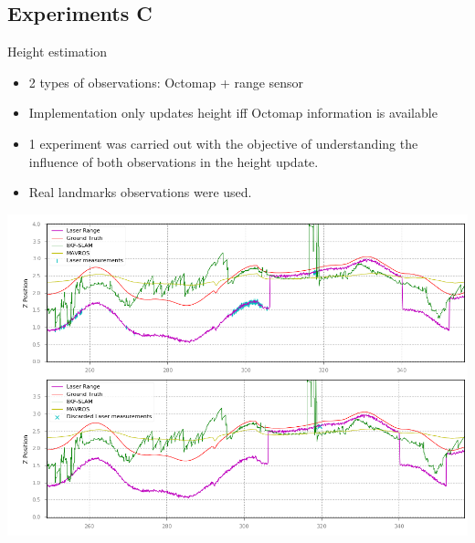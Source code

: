 \documentclass[serif]{beamer}
\begin{document}
    \subsection{Experiments C}
    \begin{frame}[nonumber]{Height estimation}
        \begin{itemize}
            \item{2 types of observations: Octomap + range sensor}
            \item{Implementation only updates height iff Octomap information is available}
            \item{1 experiment was carried out with the objective of understanding the influence of both observations in the height update.}
            \item{Real landmarks observations were used.}
        \end{itemize}
    \end{frame}
    \begin{frame}
        \centering
        \includegraphics[width=0.7\linewidth]{Images/fig23-laser-detail.png}
    \end{frame}
\end{document}
